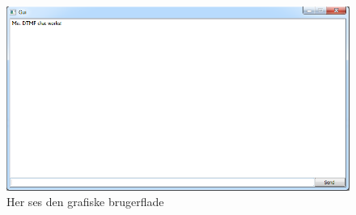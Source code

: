 \begin{figure}[h!]
\centering
\includegraphics[scale=0.5]{Billeder/GUI.PNG}
\caption{Her ses den grafiske brugerflade}
\label{fig:GUI}
\end{figure}